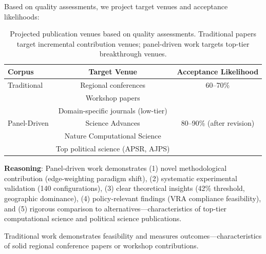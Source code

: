 Based on quality assessments, we project target venues and acceptance likelihoods:

\begin{table}[h]
\centering
\small
\begin{tabular}{lcc}
\toprule
\textbf{Corpus} & \textbf{Target Venue} & \textbf{Acceptance Likelihood} \\
\midrule
Traditional & Regional conferences & 60--70\% \\
 & Workshop papers & \\
 & Domain-specific journals (low-tier) & \\
\midrule
Panel-Driven & Science Advances & 80--90\% (after revision) \\
 & Nature Computational Science & \\
 & Top political science (APSR, AJPS) & \\
\bottomrule
\end{tabular}
\caption{Projected publication venues based on quality assessments. Traditional papers target incremental contribution venues; panel-driven work targets top-tier breakthrough venues.}
\label{tab:venues}
\end{table}

\textbf{Reasoning}: Panel-driven work demonstrates (1) novel methodological contribution (edge-weighting paradigm shift), (2) systematic experimental validation (140 configurations), (3) clear theoretical insights (42\% threshold, geographic dominance), (4) policy-relevant findings (VRA compliance feasibility), and (5) rigorous comparison to alternatives---characteristics of top-tier computational science and political science publications.

Traditional work demonstrates feasibility and measures outcomes---characteristics of solid regional conference papers or workshop contributions.
